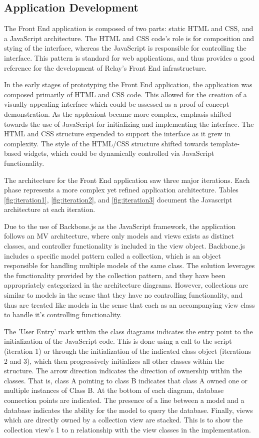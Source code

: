 \documentclass{report}
\begin{document}
\subsection{Application Development}

The Front End application is composed of two parts: static HTML and CSS, and a JavaScript architecture. The HTML and CSS code's role is for composition and stying of the interface, whereas the JavaScript is responsible for controlling the interface. This pattern is standard for web applications, and thus provides a good reference for the development of Relay's Front End infrastructure.

In the early stages of prototyping the Front End application, the application was composed primarily of HTML and CSS code. This allowed for the creation of a visually-appealing interface which could be assessed as a proof-of-concept demonstration. As the applcaiont became more complex, emphasis shifted towards the use of JavaScript for initializing and implementing the interface. The HTML and CSS structure expended to support the interface as it grew in complexity. The style of the HTML/CSS structure shifted towards template-based widgets, which could be dynamically controlled via JavaScript functionality.

The architecture for the Front End application saw three major iterations. Each phase represents a more complex yet refined application architecture. Tables \ref{fig:iteration1}, \ref{fig:iteration2}, and \ref{fig:iteration3} document the Javascript architecture at each iteration.

Due to the use of Backbone.js as the JavaScript framework, the application follows an MV architecture, where only models and views exists as distinct classes, and controller functionality is included in the view object. Backbone.js includes a specific model pattern called a collection, which is an object responsible for handling multiple models of the same class. The solution leverages the functionality provided by the collection pattern, and they have been appropriately categorized in the architecture diagrams. However, collections are similar to models in the sense that they have no controlling functionality, and thus are treated like models in the sense that each as an accompanying view class to handle it's controlling functionality.

The 'User Entry' mark within the class diagrams indicates the entry point to the initialization of the JavaScript code. This is done using a call to the script (iteration 1) or through the initialization of the indicated class object (iterations 2 and 3), which then progressively initializes all other classes within the structure. The arrow direction indicates the direction of ownership within the classes. That is, class A pointing to class B indicates that class A owned one or multiple instances of Class B. At the bottom of each diagram, database connection points are indicated. The presence of a line between a model and a database indicates the ability for the model to query the database. Finally, views which are directly owned by a collection view are stacked. This is to show the collection view's 1 to n relationship with the view classes in the implementation.
\end{document}
